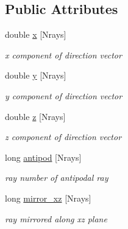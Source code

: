 \subsection*{Public Attributes}
\begin{DoxyCompactItemize}
\item 
\mbox{\label{structRAYS_a174adc5f62d8a71a6b9870677fd50b1d}} 
double \mbox{\hyperlink{structRAYS_a174adc5f62d8a71a6b9870677fd50b1d}{x}} \mbox{[}Nrays\mbox{]}
\begin{DoxyCompactList}\small\item\em x component of direction vector \end{DoxyCompactList}\item 
\mbox{\label{structRAYS_a6cf634c858baab20aa13e633231a5b00}} 
double \mbox{\hyperlink{structRAYS_a6cf634c858baab20aa13e633231a5b00}{y}} \mbox{[}Nrays\mbox{]}
\begin{DoxyCompactList}\small\item\em y component of direction vector \end{DoxyCompactList}\item 
\mbox{\label{structRAYS_adc13a4ac121cb29e98c178c70be56ad8}} 
double \mbox{\hyperlink{structRAYS_adc13a4ac121cb29e98c178c70be56ad8}{z}} \mbox{[}Nrays\mbox{]}
\begin{DoxyCompactList}\small\item\em z component of direction vector \end{DoxyCompactList}\item 
\mbox{\label{structRAYS_ace1c1a2b6a5c22c8eb1509b1f36ccdff}} 
long \mbox{\hyperlink{structRAYS_ace1c1a2b6a5c22c8eb1509b1f36ccdff}{antipod}} \mbox{[}Nrays\mbox{]}
\begin{DoxyCompactList}\small\item\em ray number of antipodal ray \end{DoxyCompactList}\item 
\mbox{\label{structRAYS_aa26d8877ea76deb3876eb41b8f9e1bf1}} 
long \mbox{\hyperlink{structRAYS_aa26d8877ea76deb3876eb41b8f9e1bf1}{mirror\+\_\+xz}} \mbox{[}Nrays\mbox{]}
\begin{DoxyCompactList}\small\item\em ray mirrored along xz plane \end{DoxyCompactList}\end{DoxyCompactItemize}


